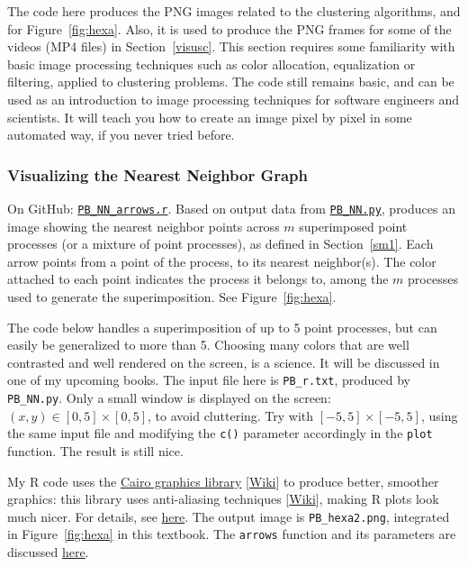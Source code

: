 \documentclass[10pt]{article}
\begin{document}
The code here produces the PNG images related to the clustering algorithms, and for Figure~\ref{fig:hexa}. Also, it is used to produce the PNG frames for some of the videos (MP4 files) in
Section~\ref{visusc}.  This section requires some familiarity with basic image processing techniques such as
color allocation, equalization or filtering, applied to clustering problems. The code still remains basic, and can be used as an introduction to image processing techniques for software engineers and scientists. It will teach you how to create an image pixel by pixel in some automated way, if you never tried before.

\subsubsection{Visualizing the Nearest Neighbor Graph}\label{rrr4}

{On GitHub}: \href{https://github.com/VincentGranville/Point-Processes/blob/main/Source\%20Code/PP_NN_arrows.r}{\texttt{PB\_NN\_arrows.r}}. Based on output data from
       \href{https://github.com/VincentGranville/Point-Processes/blob/main/Source\%20Code/PB_NN.py}{\texttt{PB\_NN.py}}, produces an image showing the nearest neighbor points
     across $m$ superimposed point processes (or a mixture of point processes), as defined in Section~\ref{sm1}. Each arrow points from a point of the process, to its nearest neighbor(s).
    The color attached to each point indicates the process it belongs to, among the $m$ processes used to generate the superimposition. See
    Figure~\ref{fig:hexa}.

The code below handles a superimposition of up to 5 point processes, but can easily be generalized to more than 5. Choosing many colors that are well contrasted
and well rendered on the screen, is a science. It will be discussed in one of my upcoming books. The input file here is \texttt{PB\_r.txt}, produced by \texttt{PB\_NN.py}. Only a small window is displayed on the screen: $(x, y)\in [0, 5] \times [0, 5]$,
to avoid cluttering. Try with $[-5, 5] \times [-5,5]$, using the same input file and modifying the \texttt{c()} parameter accordingly in the
\texttt{plot} function. The result is still nice.

My R code uses the \href{https://www.cairographics.org/}{Cairo graphics library} [\href{https://en.wikipedia.org/wiki/Cairo_(graphics)}{Wiki}] to
produce better, smoother graphics: this library uses anti-aliasing techniques [\href{https://en.wikipedia.org/wiki/Spatial_anti-aliasing}{Wiki}], making R
plots look much nicer. For details, see \href{https://www.rdocumentation.org/packages/Cairo/versions/1.5-14/topics/Cairo}{here}. The output image is
\texttt{PB\_hexa2.png}, integrated in Figure~\ref{fig:hexa} in this textbook.  The \texttt{arrows} function and its parameters are discussed
\href{https://stat.ethz.ch/R-manual/R-devel/library/graphics/html/arrows.html}{here}.
\end{document}
